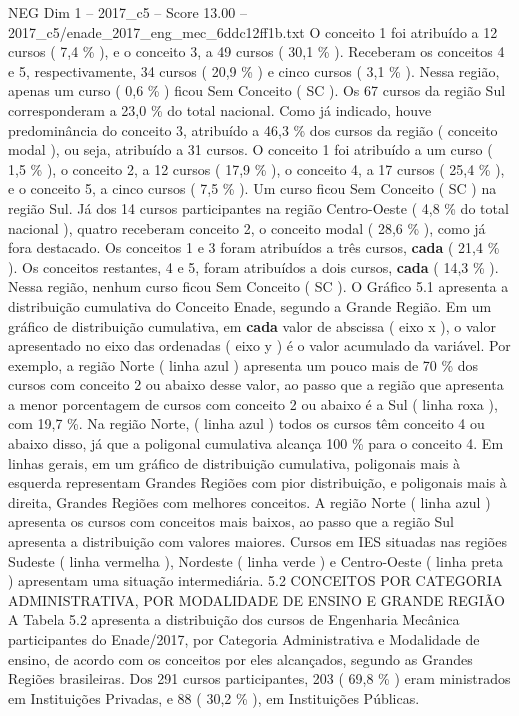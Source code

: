 \begin{textsample}{NEG Dim 1 – 2017\_c5 – Score 13.00 – 2017\_c5/enade\_2017\_eng\_mec\_6ddc12ff1b.txt}
O conceito 1 foi atribuído a 12 cursos ( 7,4 \% ), e o conceito 3, a 49 cursos ( 30,1 \% ).
Receberam os conceitos 4 e 5, respectivamente, 34 cursos ( 20,9 \% ) e cinco cursos ( 3,1 \% ).
Nessa região, apenas um curso ( 0,6 \% ) ficou Sem Conceito ( SC ).
Os 67 cursos da região Sul corresponderam a 23,0 \% do total nacional.
Como já indicado, houve predominância do conceito 3, atribuído a 46,3 \% dos cursos da região ( conceito modal ), ou seja, atribuído a 31 cursos.
O conceito 1 foi atribuído a um curso ( 1,5 \% ), o conceito 2, a 12 cursos ( 17,9 \% ), o conceito 4, a 17 cursos ( 25,4 \% ), e o conceito 5, a cinco cursos ( 7,5 \% ).
Um curso ficou Sem Conceito ( SC ) na região Sul.
Já dos 14 cursos participantes na região Centro-Oeste ( 4,8 \% do total nacional ), quatro receberam conceito 2, o conceito modal ( 28,6 \% ), como já fora destacado.
Os conceitos 1 e 3 foram atribuídos a três cursos, \textbf{cada} ( 21,4 \% ).
Os conceitos restantes, 4 e 5, foram atribuídos a dois cursos, \textbf{cada} ( 14,3 \% ).
Nessa região, nenhum curso ficou Sem Conceito ( SC ).
O Gráfico 5.1 apresenta a distribuição cumulativa do Conceito Enade, segundo a Grande Região.
Em um gráfico de distribuição cumulativa, em \textbf{cada} valor de abscissa ( eixo x ), o valor apresentado no eixo das ordenadas ( eixo y ) é o valor acumulado da variável.
Por exemplo, a região Norte ( linha azul ) apresenta um pouco mais de 70 \% dos cursos com conceito 2 ou abaixo desse valor, ao passo que a região que apresenta a menor porcentagem de cursos com conceito 2 ou abaixo é a Sul ( linha roxa ), com 19,7 \%.
Na região Norte, ( linha azul ) todos os cursos têm conceito 4 ou abaixo disso, já que a poligonal cumulativa alcança 100 \% para o conceito 4.
Em linhas gerais, em um gráfico de distribuição cumulativa, poligonais mais à esquerda representam Grandes Regiões com pior distribuição, e poligonais mais à direita, Grandes Regiões com melhores conceitos.
A região Norte ( linha azul ) apresenta os cursos com conceitos mais baixos, ao passo que a região Sul apresenta a distribuição com valores maiores.
Cursos em IES situadas nas regiões Sudeste ( linha vermelha ), Nordeste ( linha verde ) e Centro-Oeste ( linha preta ) apresentam uma situação intermediária. 5.2 CONCEITOS POR CATEGORIA ADMINISTRATIVA, POR MODALIDADE DE ENSINO E GRANDE REGIÃO A Tabela 5.2 apresenta a distribuição dos cursos de Engenharia Mecânica participantes do Enade/2017, por Categoria Administrativa e Modalidade de ensino, de acordo com os conceitos por eles alcançados, segundo as Grandes Regiões brasileiras.
Dos 291 cursos participantes, 203 ( 69,8 \% ) eram ministrados em Instituições Privadas, e 88 ( 30,2 \% ), em Instituições Públicas.

\end{textsample}
